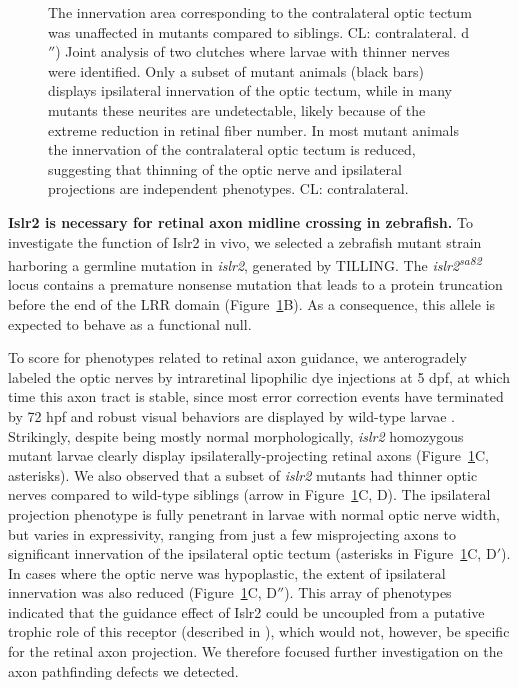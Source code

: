 \begin{figure}[hbtp]
\begin{center}
{		The innervation area corresponding to the contralateral optic tectum was unaffected in mutants compared to siblings.
		CL: contralateral.
		d$''$) Joint analysis of two clutches where larvae with thinner nerves were identified.
		Only a subset of mutant animals (black bars) displays ipsilateral innervation of the optic tectum, while in many mutants these neurites are undetectable, likely because of the extreme reduction in retinal fiber number.
		In most mutant animals the innervation of the contralateral optic tectum is reduced, suggesting that thinning of the optic nerve and ipsilateral projections are independent phenotypes.
		CL: contralateral.
		}
        \label{Linxfig1}
    \end{center}
\end{figure}

\textbf{Islr2 is necessary for retinal axon midline crossing in zebrafish.}\newline
To investigate the function of Islr2 in vivo, we selected a zebrafish mutant strain harboring a germline mutation in \emph{islr2}, generated by TILLING.
The \emph{islr2\textsuperscript{sa82}} locus contains a premature nonsense mutation that leads to a protein truncation before the end of the LRR domain (Figure~\ref{Linxfig1}B).
As a consequence, this allele is expected to behave as a functional null.

To score for phenotypes related to retinal axon guidance, we anterogradely labeled the optic nerves by intraretinal lipophilic dye injections at 5 dpf, at which time this axon tract is stable, since most error correction events have terminated by 72 hpf \cite{hutson2002pathfinding} and robust visual behaviors are displayed by wild-type larvae \cite{easter1996development,neuhauss2003behavioral}.
Strikingly, despite being mostly normal morphologically, \emph{islr2} homozygous mutant larvae clearly display ipsilaterally-projecting retinal axons (Figure~\ref{Linxfig1}C, asterisks).
We also observed that a subset of \emph{islr2} mutants had thinner optic nerves compared to wild-type siblings (arrow in Figure~\ref{Linxfig1}C, D).
The ipsilateral projection phenotype is fully penetrant in larvae with normal optic nerve width, but varies in expressivity, ranging from just a few misprojecting axons to significant innervation of the ipsilateral optic tectum (asterisks in Figure~\ref{Linxfig1}C, D$'$).
In cases where the optic nerve was hypoplastic, the extent of ipsilateral innervation was also reduced (Figure~\ref{Linxfig1}C, D$''$).
This array of phenotypes indicated that the guidance effect of Islr2 could be uncoupled from a putative trophic role of this receptor (described in ), which would not, however, be specific for the retinal axon projection.
We therefore focused further investigation on the axon pathfinding defects we detected.

